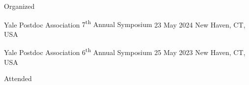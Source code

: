 


Organized

\begin{cventries}
  \cventry
    {Yale Postdoc Association} %
    {7\textsuperscript{th} Annual Symposium} %
    {23 May 2024} %
    {New Haven, CT, USA} %
    {
    }

  \cventry
    {Yale Postdoc Association} %
    {6\textsuperscript{th} Annual Symposium} %
    {25 May 2023} %
    {New Haven, CT, USA} %
    {
    }
\end{cventries}

Attended

